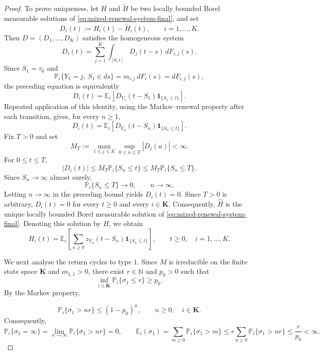 \documentclass[10pt,a4paper]{amsart}
\newcommand{\E}{\mathbb E}
\newcommand{\Kk}{\mathbf K}
\newcommand{\N}{\mathbb N}
\newcommand{\Pbb}{\mathbb P}
\newcommand{\ind}[1]{\mathbf 1_{\{#1\}}}
\begin{document}
\begin{proof}
To prove uniqueness, let \(H\) and \(\widetilde H\) be two locally bounded Borel measurable solutions of \eqref{eq:mixed-renewal-system-final}, and set
\[
  D_i(t):=H_i(t)-\widetilde H_i(t),
  \qquad i=1,\dots,K.
\]
Then \(D=(D_1,\dots,D_K)\) satisfies the homogeneous system
\[
  D_i(t)
  =
  \sum_{j=1}^K
  \int_{[0,t]}D_j(t-s)\,dF_{i,j}(s).
\]
Since \(S_1=\tau_0\) and
\[
  \Pbb_i\{Y_1=j,\ S_1\in ds\}
  =
  m_{i,j}\,dF_i(s)
  =
  dF_{i,j}(s),
\]
the preceding equation is equivalently
\[
  D_i(t)
  =
  \E_i\left[
    D_{Y_1}(t-S_1)\ind{S_1\le t}
  \right].
\]
Repeated application of this identity, using the Markov--renewal property after each transition, gives, for every \(n\ge1\),
\[
  D_i(t)
  =
  \E_i\left[
    D_{Y_n}(t-S_n)\ind{S_n\le t}
  \right].
\]
Fix \(T>0\) and set
\[
  M_T:=
  \max_{1\le j\le K}\sup_{0\le u\le T}|D_j(u)|<\infty.
\]
For \(0\le t\le T\),
\[
  |D_i(t)|
  \le
  M_T\Pbb_i\{S_n\le t\}
  \le
  M_T\Pbb_i\{S_n\le T\}.
\]
Since \(S_n\to\infty\) almost surely,
\[
  \Pbb_i\{S_n\le T\}\longrightarrow0,
  \qquad n\to\infty.
\]
Letting \(n\to\infty\) in the preceding bound yields \(D_i(t)=0\). Since \(T>0\) is arbitrary, \(D_i(t)=0\) for every \(t\ge0\) and every \(i\in\Kk\). Consequently, \(\widehat H\) is the unique locally bounded Borel measurable solution of \eqref{eq:mixed-renewal-system-final}. Denoting this solution by \(H\), we obtain
\begin{equation}\label{eq:renewal-representation-final}
  H_i(t)
  =
  \E_i\left[
    \sum_{n\ge0}
    z_{Y_n}(t-S_n)\ind{S_n\le t}
  \right],
  \qquad t\ge0,\quad i=1,\dots,K.
\end{equation}

We next analyse the return cycles to type \(1\). Since \(M\) is irreducible on the finite state space \(\Kk\) and \(m_{1,1}>0\), there exist \(r\in\N\) and \(p_0>0\) such that
\[
  \inf_{i\in\Kk}\Pbb_i\{\sigma_1\le r\}\ge p_0.
\]
By the Markov property,

\begin{equation}\label{eq:return-exp-tail-final}
  \Pbb_i\{\sigma_1>nr\}\le(1-p_0)^n,\qquad n\ge0,\quad i\in\Kk.
\end{equation}
Consequently,
\[
  \Pbb_i\{\sigma_1=\infty\}=\lim_{n\to\infty}\Pbb_i\{\sigma_1>nr\}=0,\qquad \E_i(\sigma_1)=\sum_{m\ge0}\Pbb_i\{\sigma_1>m\}\le r\sum_{n\ge0}\Pbb_i\{\sigma_1>nr\}\le\frac{r}{p_0}<\infty.
\]


\end{proof}
\end{document}
